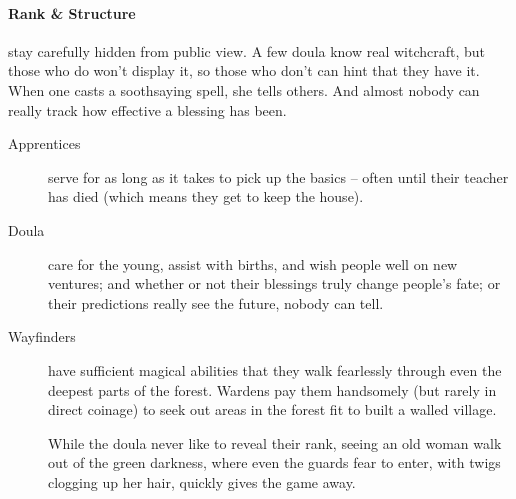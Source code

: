 \begin{multicols}{2}
  \paragraph{Rank \& Structure}
  stay carefully hidden from public view.
  A few doula know real witchcraft, but those who do won't display it, so those who don't can hint that they have it.
  When one casts a soothsaying spell, she tells others.
  And almost nobody can really track how effective a blessing has been.

  \begin{description}
    \item[Apprentices]
    serve for as long as it takes to pick up the basics -- often until their teacher has died (which means they get to keep the house).
    \item[Doula]
    care for the young, assist with births, and wish people well on new ventures; and whether or not their blessings truly change people's fate; or their predictions really see the future, nobody can tell.
    \item[Wayfinders]
    have sufficient magical abilities that they walk fearlessly through even the deepest parts of the forest.
    Wardens pay them handsomely (but rarely in direct coinage) to seek out areas in the forest fit to built a walled village.

    While the doula never like to reveal their rank, seeing an old woman walk out of the green darkness, where even the \glspl{guard} fear to enter, with twigs clogging up her hair, quickly gives the game away.
  \end{description}

\end{multicols}
